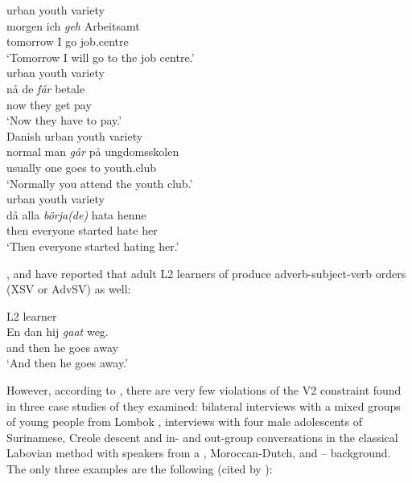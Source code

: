 \documentclass[output=paper]{langsci/langscibook}
\begin{document}
\ea
    \ea {} urban youth variety \parencite[787]{Wiese:2009}\\
    \gll morgen ich \textit{geh} Arbeitsamt\\
    tomorrow I go job.centre\\
    \trans \enquote*{Tomorrow I will go to the job centre.}\\
    \ex {} urban youth variety \parencite[133]{Opsahl:2009a}\\
    \gll n\aa{} de \textit{f{\aa}r} betale\\
    now they get pay\\
    \trans \enquote*{Now they have to pay.}\\
    \ex Danish urban youth variety \parencite[47]{Quist:2008}\\
    \gll normal man \textit{g{\aa}r} p{\aa} ungdomsskolen\\
    usually one goes to youth.club\\
    \trans \enquote*{Normally you attend the youth club.}\\
    \ex {} urban youth variety \parencite[53]{Ganuza:2008}\\
    \gll d\aa{} alla \textit{börja(de)} hata henne\\
    then everyone started hate her\\
    \trans \enquote*{Then everyone started hating her.}
    \z
\z


\noindent \citet{Appel:1984}, \citet[91]{AppelMuysken:1987} and
\citet{SchwartzSprouse:2000} have reported that adult L2 learners of 
produce adverb-subject-verb orders (XSV or AdvSV) as well:

\begin{exe}                   %
\ex {} L2 learner \parencite{Appel:1984}\\
    \gll En dan hij \textit{gaat} weg.\\
    and then he goes away\\
    \trans \enquote*{And then he goes away.}
\end{exe}                   %

\noindent However, according to \citet{Freywaldetal:2015}, there are very few
violations of the V2 constraint found in three case studies of  they
examined: bilateral interviews with a mixed groups of young people from Lombok
\citep{Cornips:2002}, interviews with four male adolescents of Surinamese,
Creole descent \citep{CornipsDeRooij:2013} and in- and out-group conversations
in the classical Labovian method with speakers from a , Moroccan-Dutch,
and -- background. The only three examples are the following (cited
by \citealt[86--87]{Freywaldetal:2015}):
\end{document}
